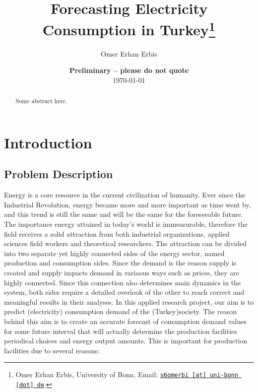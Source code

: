 \documentclass[11pt, a4paper, leqno]{article}
\begin{document}
\title{Forecasting Electricity Consumption in Turkey\thanks{Omer Erhan Erbis, University of Bonn. Email: \href{mailto:s6omerbi@uni-bonn.de}{\nolinkurl{s6omerbi [at] uni-bonn [dot] de}}.}}

\author{Omer Erhan Erbis}

\date{
    {\bf Preliminary -- please do not quote}
    \\[1ex]
    \today
}

\maketitle


\begin{abstract}
    Some abstract here.
\end{abstract}

\clearpage


\section{Introduction} %
\label{sec:introduction}

\subsection{Problem Description}
\label{subsec:problem}

\begin{comment}
If you are using this template, please cite this item from the references:
\citet{GaudeckerEconProjectTemplates}.
\end{comment}

Energy is a core resource in the current civilization of humanity. Ever since the Industrial Revolution, energy became more and more important as time went by, and this trend is still the same and will be the same for the foreseeable future. The importance energy attained in today’s world is immeasurable, therefore the field receives a solid attraction from both industrial organizations, applied sciences field workers and theoretical researchers.
The attraction can be divided into two separate yet highly connected sides of the energy sector, named production and consumption sides. Since the demand is the reason supply is created and supply impacts demand in variaous ways such as prices, they are highly connected. Since this connection also determines main dynamics in the system, both sides require a detailed overlook of the other to reach correct and meaningful results in their analyses.
In this applied research project, our aim is to predict (electricity) consumption demand of the (Turkey)society. The reason behind this aim is to create an accurate forecast of consumption demand values for some future interval that will actually determine the production facilities periodical choices and energy output amounts.
This is important for production facilities due to several reasons:
\end{document}
